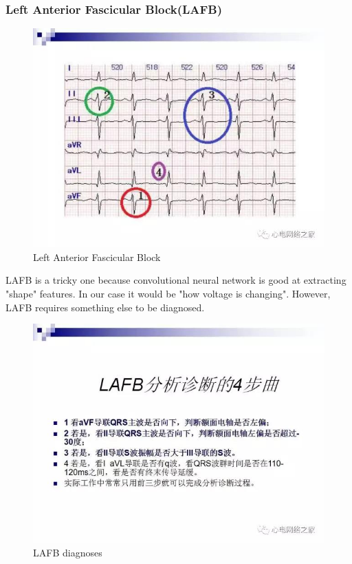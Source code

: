 \documentclass[runningheads]{llncs}
\begin{document}
\subsubsection{Left Anterior Fascicular Block(LAFB)}
\begin{figure}[H]
	\includegraphics[width=\linewidth]{img/LAFB1.jpg}
	\caption{\label{fig:lafb1} Left Anterior Fascicular Block \cite{Yu}}
\end{figure}
LAFB is a tricky one because convolutional neural network is good at extracting "shape" features. In our case it would be "how voltage is changing". However, LAFB requires something else to be diagnosed. 
\begin{figure}[H]
	\includegraphics[width=\linewidth]{img/LAFB2.jpg}
	\caption{\label{fig:lafb2} LAFB diagnoses \cite{Yu}}
\end{figure}
\end{document}
